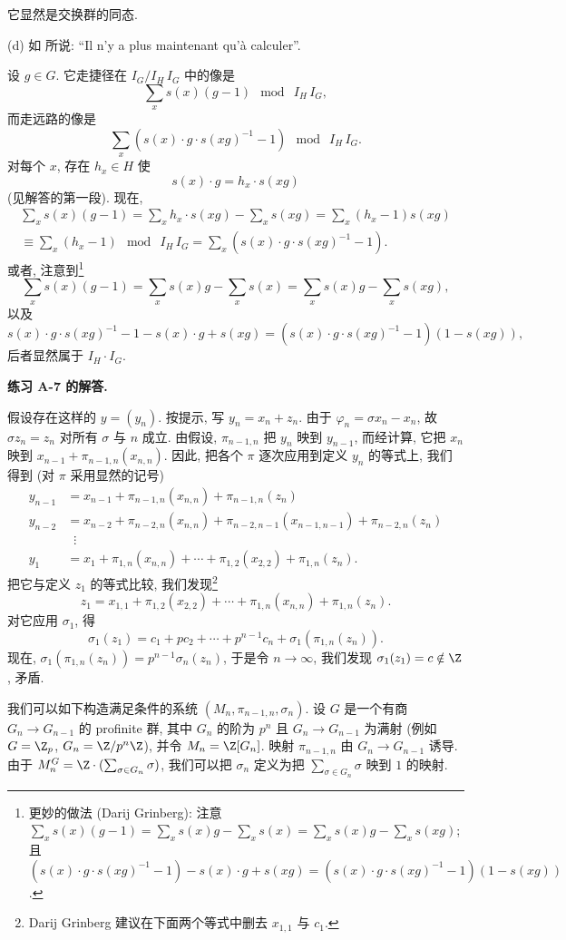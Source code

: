 它显然是交换群的同态.

(d) 如 \cite[p.~129]{Serre1962} 所说: ``Il n'y a plus maintenant qu'\`a calculer''.

设 $g\in G$. 它走捷径在 $I_G/I_H\, I_G$ 中的像是
\[
\sum_x s(x)(g-1)\ \bmod\ I_H\, I_G,
\]
而走远路的像是
\[
\sum_x(s(x)\cdot g\cdot s(xg)^{-1}-1)\ \bmod\ I_H\, I_G.
\]
对每个 $x$, 存在 $h_x\in H$ 使
\[
s(x)\cdot g=h_x\cdot s(xg)
\]
(见解答的第一段). 现在,
\begin{multline*}
\sum_x s(x)(g-1)=\sum_x h_x\cdot s(xg)-\sum_x s(xg)=\sum_x(h_x-1)s(xg)\\
\equiv\sum_x(h_x-1)\ \bmod\ I_H\, I_G=\sum_x(s(x)\cdot g\cdot s(xg)^{-1}-1).
\end{multline*}
或者, 注意到\footnote{更妙的做法 (Darij Grinberg): 注意 $\sum_x s(x)(g-1)=\sum_x s(x)g-\sum_x s(x)=\sum_x s(x)g-\sum_x s(xg)$; 且 $(s(x)\cdot g\cdot s(xg)^{-1}-1)-s(x)\cdot g+s(xg)=(s(x)\cdot g\cdot s(xg)^{-1}-1)(1-s(xg))$.}
\[
\sum_x s(x)(g-1)=\sum_x s(x)g-\sum_x s(x)=\sum_x s(x)g-\sum_x s(xg),
\]
以及
\[
s(x)\cdot g\cdot s(xg)^{-1}-1-s(x)\cdot g+s(xg)=(s(x)\cdot g\cdot s(xg)^{-1}-1)(1-s(xg)),
\]
后者显然属于 $I_H\cdot I_G$.

\noindent\textbf{练习 A-7 的解答.}

假设存在这样的 $y=(y_n)$. 按提示, 写 $y_n=x_n+z_n$. 由于 $\varphi_n=\sigma x_n-x_n$, 故 $\sigma z_n=z_n$ 对所有 $\sigma$ 与 $n$ 成立. 由假设, $\pi_{n-1,n}$ 把 $y_n$ 映到 $y_{n-1}$, 而经计算, 它把 $x_n$ 映到 $x_{n-1}+\pi_{n-1,n}(x_{n,n})$. 因此, 把各个 $\pi$ 逐次应用到定义 $y_n$ 的等式上, 我们得到 (对 $\pi$ 采用显然的记号)
\[
\begin{aligned}
y_{n-1}&=x_{n-1}+\pi_{n-1,n}(x_{n,n})+\pi_{n-1,n}(z_n)\\
y_{n-2}&=x_{n-2}+\pi_{n-2,n}(x_{n,n})+\pi_{n-2,n-1}(x_{n-1,n-1})+\pi_{n-2,n}(z_n)\\
&\;\;\vdots\\
y_1&=x_1+\pi_{1,n}(x_{n,n})+\cdots+\pi_{1,2}(x_{2,2})+\pi_{1,n}(z_n).
\end{aligned}
\]
把它与定义 $z_1$ 的等式比较, 我们发现\footnote{Darij Grinberg 建议在下面两个等式中删去 $x_{1,1}$ 与 $c_1$.}
\[
z_1=x_{1,1}+\pi_{1,2}(x_{2,2})+\cdots+\pi_{1,n}(x_{n,n})+\pi_{1,n}(z_n).
\]
对它应用 $\sigma_1$, 得
\[
\sigma_1(z_1)=c_1+pc_2+\cdots+p^{n-1}c_n+\sigma_1(\pi_{1,n}(z_n)).
\]
现在, $\sigma_1(\pi_{1,n}(z_n))=p^{n-1}\sigma_n(z_n)$, 于是令 $n\to\infty$, 我们发现 $\sigma_1(z_1)=c\notin\Z$, 矛盾.

我们可以如下构造满足条件的系统 $(M_n,\pi_{n-1,n},\sigma_n)$. 设 $G$ 是一个有商 $G_n\to G_{n-1}$ 的 profinite 群, 其中 $G_n$ 的阶为 $p^{n}$ 且 $G_n\to G_{n-1}$ 为满射 (例如 $G=\Z_p$, $G_n=\Z/p^n\Z$), 并令 $M_n=\Z[G_n]$. 映射 $\pi_{n-1,n}$ 由 $G_n\to G_{n-1}$ 诱导. 由于 $M_n^{G}=\Z\cdot(\sum_{\sigma\in G_n}\sigma)$, 我们可以把 $\sigma_n$ 定义为把 $\sum_{\sigma\in G_n}\sigma$ 映到 $1$ 的映射.

